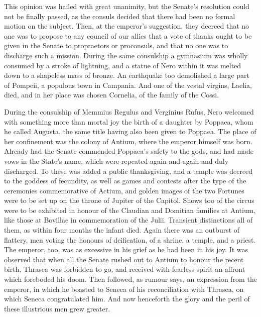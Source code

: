 
This opinion was hailed with great unanimity, but the Senate's resolution could not be finally passed, as the consuls decided that there had been no formal motion on the subject. Then, at the emperor's suggestion, they decreed that no one was to propose to any council of our allies that a vote of thanks ought to be given in the Senate to propraetors or proconsuls, and that no one was to discharge such a mission. During the same consulship a gymnasium was wholly consumed by a stroke of lightning, and a statue of Nero within it was melted down to a shapeless mass of bronze. An earthquake too demolished a large part of Pompeii, a populous town in Campania. And one of the vestal virgins, Laelia, died, and in her place was chosen Cornelia, of the family of the Cossi.


During the consulship of Memmius Regulus and Verginius Rufus, Nero welcomed with something more than mortal joy the birth of a daughter by Poppaea, whom he called Augusta, the same title having also been given to Poppaea. The place of her confinement was the colony of Antium, where the emperor himself was born. Already had the Senate commended Poppaea's safety to the gods, and had made vows in the State's name, which were repeated again and again and duly discharged. To these was added a public thanksgiving, and a temple was decreed to the goddess of fecundity, as well as games and contests after the type of the ceremonies commemorative of Actium, and golden images of the two Fortunes were to be set up on the throne of Jupiter of the Capitol. Shows too of the circus were to be exhibited in honour of the Claudian and Domitian families at Antium, like those at Bovillae in commemoration of the Julii. Transient distinctions all of them, as within four months the infant died. Again there was an outburst of flattery, men voting the honours of deification, of a shrine, a temple, and a priest. The emperor, too, was as excessive in his grief as he had been in his joy. It was observed that when all the Senate rushed out to Antium to honour the recent birth, Thrasea was forbidden to go, and received with fearless spirit an affront which foreboded his doom. Then followed, as rumour says, an expression from the emperor, in which he boasted to Seneca of his reconciliation with Thrasea, on which Seneca congratulated him. And now henceforth the glory and the peril of these illustrious men grew greater.


